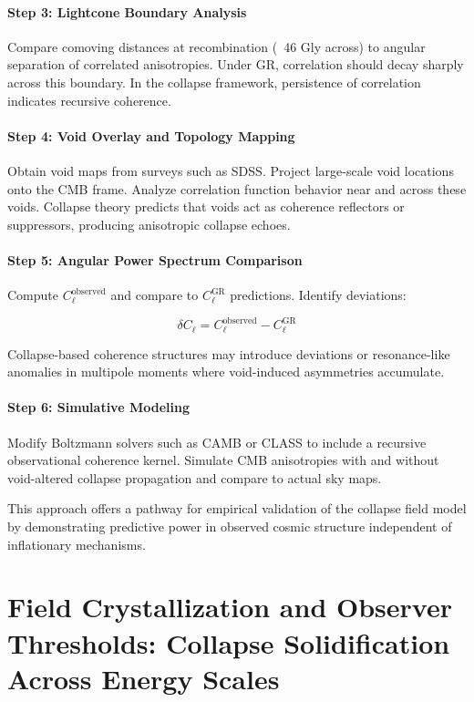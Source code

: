 \paragraph{Step 3: Lightcone Boundary Analysis}
Compare comoving distances at recombination (~46 Gly across) to angular separation of correlated anisotropies. Under GR, correlation should decay sharply across this boundary. In the collapse framework, persistence of correlation indicates recursive coherence.

\paragraph{Step 4: Void Overlay and Topology Mapping}
Obtain void maps from surveys such as SDSS. Project large-scale void locations onto the CMB frame. Analyze correlation function behavior near and across these voids. Collapse theory predicts that voids act as coherence reflectors or suppressors, producing anisotropic collapse echoes.

\paragraph{Step 5: Angular Power Spectrum Comparison}
Compute \( C_\ell^{\text{observed}} \) and compare to \( C_\ell^{\text{GR}} \) predictions. Identify deviations:

\[ \delta C_\ell = C_\ell^{\text{observed}} - C_\ell^{\text{GR}} \]

Collapse-based coherence structures may introduce deviations or resonance-like anomalies in multipole moments where void-induced asymmetries accumulate.

\paragraph{Step 6: Simulative Modeling}
Modify Boltzmann solvers such as CAMB or CLASS to include a recursive observational coherence kernel. Simulate CMB anisotropies with and without void-altered collapse propagation and compare to actual sky maps.

This approach offers a pathway for empirical validation of the collapse field model by demonstrating predictive power in observed cosmic structure independent of inflationary mechanisms.

\section{Field Crystallization and Observer Thresholds: Collapse Solidification Across Energy Scales}

